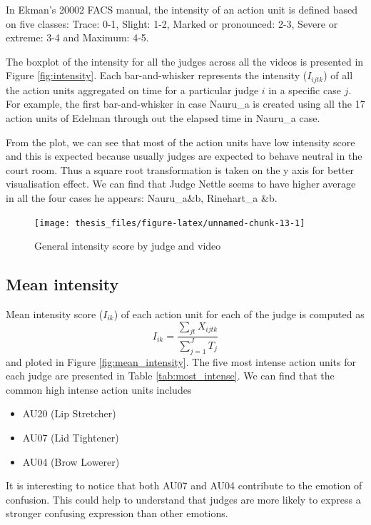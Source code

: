 \documentclass{monashthesis}
\begin{document}
In Ekman's 20002 FACS manual, the intensity of an action unit is defined based on five classes: Trace: 0-1, Slight: 1-2, Marked or pronounced: 2-3, Severe or extreme: 3-4 and Maximum: 4-5.

The boxplot of the intensity for all the judges across all the videos is presented in Figure \ref{fig:intensity}. Each bar-and-whisker represents the intensity (\(I_{ijtk}\)) of all the action units aggregated on time for a particular judge \(i\) in a specific case \(j\). For example, the first bar-and-whisker in case Nauru\_a is created using all the 17 action units of Edelman through out the elapsed time in Nauru\_a case.

From the plot, we can see that most of the action units have low intensity score and this is expected because usually judges are expected to behave neutral in the court room. Thus a square root transformation is taken on the y axis for better visualisation effect. We can find that Judge Nettle seems to have higher average in all the four cases he appears: Nauru\_a\&b, Rinehart\_a \&b.

\begin{figure}
\texttt{[image: thesis\_files/figure-latex/unnamed-chunk-13-1]} \caption{General intensity score by judge and video\label{fig:intensity}}\label{fig:unnamed-chunk-13}
\end{figure}

\hypertarget{mean-intensity}{%
\subsection{Mean intensity}\label{mean-intensity}}

Mean intensity score (\(I_{ik}\)) of each action unit for each of the judge is computed as \[I_{ik} = \frac{\sum_{jt}X_{ijtk}}{\sum_{j = 1}^JT_j}\] and ploted in Figure \ref{fig:mean_intensity}. The five most intense action units for each judge are presented in Table \ref{tab:most_intense}. We can find that the common high intense action units includes

\begin{itemize}
\tightlist
\item
  AU20 (Lip Stretcher)
\item
  AU07 (Lid Tightener)
\item
  AU04 (Brow Lowerer)
\end{itemize}

It is interesting to notice that both AU07 and AU04 contribute to the emotion of confusion. This could help to understand that judges are more likely to express a stronger confusing expression than other emotions.
\end{document}
